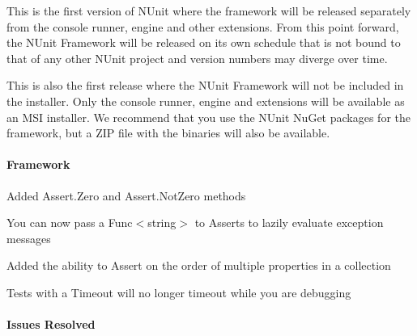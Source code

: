 This is the first version of N\+Unit where the framework will be released separately from the console runner, engine and other extensions. From this point forward, the N\+Unit Framework will be released on its own schedule that is not bound to that of any other N\+Unit project and version numbers may diverge over time.

This is also the first release where the N\+Unit Framework will not be included in the installer. Only the console runner, engine and extensions will be available as an M\+SI installer. We recommend that you use the N\+Unit Nu\+Get packages for the framework, but a Z\+IP file with the binaries will also be available.

\paragraph*{Framework}


\begin{DoxyItemize}
\item Added Assert.\+Zero and Assert.\+Not\+Zero methods
\item You can now pass a {\ttfamily Func$<$string$>$} to Asserts to lazily evaluate exception messages
\item Added the ability to Assert on the order of multiple properties in a collection
\item Tests with a Timeout will no longer timeout while you are debugging
\end{DoxyItemize}

\paragraph*{Issues Resolved}


